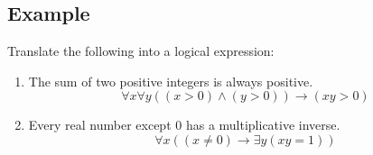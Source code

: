 \documentclass[letterpaper, 12pt]{math}
\begin{document}
\subsection*{Example}
Translate the following into a logical expression:
\begin{enumerate}
  \item The sum of two positive integers is always positive.
  \[ \forall{x}\forall{y}((x > 0) \wedge (y > 0)) \to (xy > 0) \]
  \item Every real number except 0 has a multiplicative inverse.
  \[ \forall{x}((x \neq 0) \to \exists{y}(xy = 1)) \]
\end{enumerate}
\end{document}
